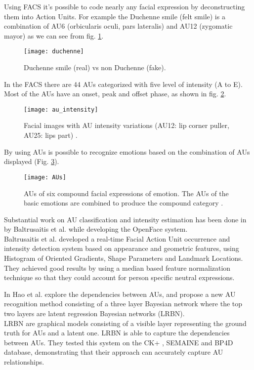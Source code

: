 Using FACS it's possible to code nearly any facial expression by deconstructing them into Action Units. For example the Duchenne smile (felt smile) is a combination of AU6 (orbicularis oculi, pars lateralis) and AU12 (zygomatic mayor) as we can see from fig. \ref{fig:duchenne}.

\begin{figure}[H]
	\centering
	\texttt{[image: duchenne]}
	\caption{Duchenne smile (real) vs non Duchenne (fake).}
	\label{fig:duchenne}
\end{figure}

In the FACS there are 44 AUs categorized with five level of intensity (A to E). Most of the AUs have an onset, peak and offset phase, as shown in fig. \ref{fig:au_intensity}. 

\begin{figure}[H]
	\centering
	\texttt{[image: au\_intensity]}
	\caption{Facial images with AU intensity variations (AU12: lip corner puller, AU25: lips part) \cite{DISFA}.}
	\label{fig:au_intensity}
\end{figure}

By using AUs is possible to recognize emotions based on the combination of AUs displayed (Fig. \ref{fig:AUs}).

\begin{figure}[H]
	\centering
	\texttt{[image: AUs]}
	\caption{AUs of six compound facial expressions of emotion. The AUs of the basic emotions are combined to produce the compound category \cite{Du2014CompoundFE}.}
	\label{fig:AUs}
\end{figure}

Substantial work on AU classification and intensity estimation has been done in \cite{Baltru2015} by Baltrusaitis et al. while developing the OpenFace \cite{Baltru2016} system. \\
Baltrusaitis et al. developed a real-time Facial Action Unit occurrence and intensity detection system based on appearance and geometric features, using Histogram of Oriented Gradients, Shape Parameters and Landmark Locations. They achieved good results by using a median based feature normalization technique so that they could account for person specific neutral expressions.

In \cite{HaoWangAU} Hao et al. explore the dependencies between AUs, and propose a new AU recognition method consisting of a three layer Bayesian network where the top two layers are latent regression Bayesian networks (LRBN). \\
LRBN are graphical models consisting of a visible layer representing the ground truth for AUs and a latent one. LRBN is able to capture the dependencies between AUs. They tested this system on the CK+ \cite{CK+}, SEMAINE \cite{SEMAINE} and BP4D \cite{BP4D-Spontaneous} database, demonstrating that their approach can accurately capture AU relationships.


